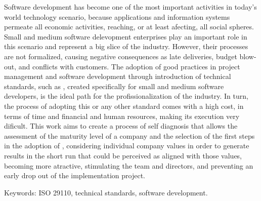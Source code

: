 Software development has become one of the most important activities in today's world technology scenario, because applications and information systems permeate all economic activities, reaching, or at least afecting, all social spheres. Small and medium software delevopment enterprises play an important role in this scenario and represent a big slice of the industry. However, their processes are not formalized, causing negative consequences as late deliveries, budget blow-out, and conflicts with customers. The adoption of good practices in project management and software development through introduction of technical standards, such as \iso, created specifically for small and medium software developers, is the ideal path for the profissionalization of the industry. In turn, the process of adopting this or any other standard comes with a high cost, in terms of time and financial and human resources, making its execution very dificult. This work aims to create a process of self diagnosis that allows the assessment of the maturity level of a company and the selection of the first steps in the adoption of \iso, considering individual company values in order to generate results in the short run that could be perceived as aligned with those values, becoming more atractive, stimulating the team and directors, and preventing an early drop out of the implementation project.

Keywords: ISO 29110, technical standards, software development.